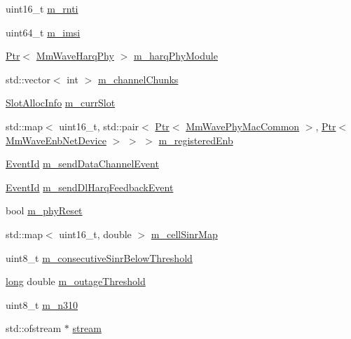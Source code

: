 \begin{DoxyCompactItemize}
uint16\+\_\+t \hyperlink{classns3_1_1MmWaveUePhy_aae63c66b69de47ac19b4033ecf4bc211}{m\+\_\+rnti}
\item 
uint64\+\_\+t \hyperlink{classns3_1_1MmWaveUePhy_ae1bada3d54462b51bc01803e56f449ee}{m\+\_\+imsi}
\item 
\hyperlink{classns3_1_1Ptr}{Ptr}$<$ \hyperlink{classns3_1_1MmWaveHarqPhy}{Mm\+Wave\+Harq\+Phy} $>$ \hyperlink{classns3_1_1MmWaveUePhy_a6d43260fc011a6b2fb4b9630188669d4}{m\+\_\+harq\+Phy\+Module}
\item 
std\+::vector$<$ int $>$ \hyperlink{classns3_1_1MmWaveUePhy_aa41c90d5e37b7b4f65a4bad8b6e4295f}{m\+\_\+channel\+Chunks}
\item 
\hyperlink{structns3_1_1SlotAllocInfo}{Slot\+Alloc\+Info} \hyperlink{classns3_1_1MmWaveUePhy_a6cd22c1e7d78e05be8a83ad1c6071f13}{m\+\_\+curr\+Slot}
\item 
std\+::map$<$ uint16\+\_\+t, std\+::pair$<$ \hyperlink{classns3_1_1Ptr}{Ptr}$<$ \hyperlink{classns3_1_1MmWavePhyMacCommon}{Mm\+Wave\+Phy\+Mac\+Common} $>$, \hyperlink{classns3_1_1Ptr}{Ptr}$<$ \hyperlink{classns3_1_1MmWaveEnbNetDevice}{Mm\+Wave\+Enb\+Net\+Device} $>$ $>$ $>$ \hyperlink{classns3_1_1MmWaveUePhy_a30d6221ea89c1d9fdc74b88da0b8360f}{m\+\_\+registered\+Enb}
\item 
\hyperlink{classns3_1_1EventId}{Event\+Id} \hyperlink{classns3_1_1MmWaveUePhy_a2a99096220cec900c61b24052a0c37b7}{m\+\_\+send\+Data\+Channel\+Event}
\item 
\hyperlink{classns3_1_1EventId}{Event\+Id} \hyperlink{classns3_1_1MmWaveUePhy_accf11cb68767e6baae1b4c54f6d5fb45}{m\+\_\+send\+Dl\+Harq\+Feedback\+Event}
\item 
bool \hyperlink{classns3_1_1MmWaveUePhy_a64e6caf030c2a285fd561cf5e28f309d}{m\+\_\+phy\+Reset}
\item 
std\+::map$<$ uint16\+\_\+t, double $>$ \hyperlink{classns3_1_1MmWaveUePhy_a650930b1b37094b98bfa45e5806d069e}{m\+\_\+cell\+Sinr\+Map}
\item 
uint8\+\_\+t \hyperlink{classns3_1_1MmWaveUePhy_a3970be469e9bda8a29a87de38daac1ca}{m\+\_\+consecutive\+Sinr\+Below\+Threshold}
\item 
\hyperlink{generate__test__data__lte__sinr_8m_a0eab6be67e93c3411f7a8b53cc297285}{long} double \hyperlink{classns3_1_1MmWaveUePhy_a70f5b46f9b554efd5c33d859250056ce}{m\+\_\+outage\+Threshold}
\item 
uint8\+\_\+t \hyperlink{classns3_1_1MmWaveUePhy_ab1c52c20727e1c5a2fdf1599c0d5d3f5}{m\+\_\+n310}
\item 
std\+::ofstream $\ast$ \hyperlink{classns3_1_1MmWaveUePhy_a90953f3aea8003a19f264b061f828507}{stream}
\end{DoxyCompactItemize}
